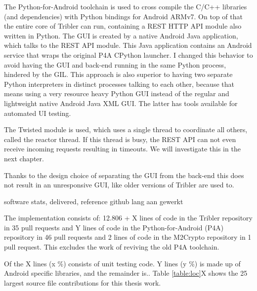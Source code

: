 The Python-for-Android toolchain is used to cross compile the C/C++ libraries (and dependencies) with Python bindings for Android ARMv7.
On top of that the entire core of Tribler can run, containing a REST HTTP API module also written in Python.
The GUI is created by a native Android Java application, which talks to the REST API module.
This Java application contains an Android service that wraps the original P4A CPython launcher.
I changed this behavior to avoid having the GUI and back-end running in the same Python process, hindered by the GIL.
This approach is also superior to having two separate Python interpreters in distinct processes talking to each other, because that means using a very resource heavy Python GUI instead of the regular and lightweight native Android Java XML GUI.
The latter has tools available for automated UI testing.



The Twisted module is used, which uses a single thread to coordinate all others, called the reactor thread.
If this thread is busy, the REST API can not even receive incoming requests resulting in timeouts.
We will investigate this in the next chapter.

Thanks to the design choice of separating the GUI from the back-end this does not result in an unresponsive GUI, like older versions of Tribler are used to.


software stats, delivered, reference github
lang aan gewerkt


The implementation consists of:
12.806 + X lines of code in the Tribler repository in 35 pull requests and
Y lines of code in the Python-for-Android (P4A) repository in 46 pull requests and
2 lines of code in the M2Crypto repository in 1 pull request.
This excludes the work of reviving the old P4A toolchain.

Of the X lines (x \%) consists of unit testing code.
Y lines (y \%) is made up of Android specific libraries, and the remainder is..
Table \ref{table:loc}X shows the 25 largest source file contributions for this thesis work. 

